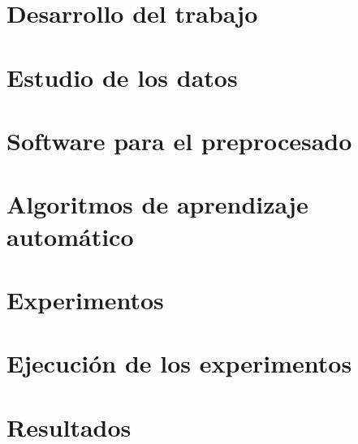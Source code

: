 \chapter{Desarrollo del trabajo}
\label{chapter:desarrollo}


\chapter{Estudio de los datos}
\label{chapter:estudio}


\chapter{Software para el preprocesado}
\label{chapter:preprocesado}


\chapter{Algoritmos de aprendizaje automático}
\label{chapter:algoritmos}


\chapter{Experimentos}
\label{chapter:experimentos}


\chapter{Ejecución de los experimentos}
\label{chapter:ejecucion}


\chapter{Resultados}
\label{chapter:resultados}

